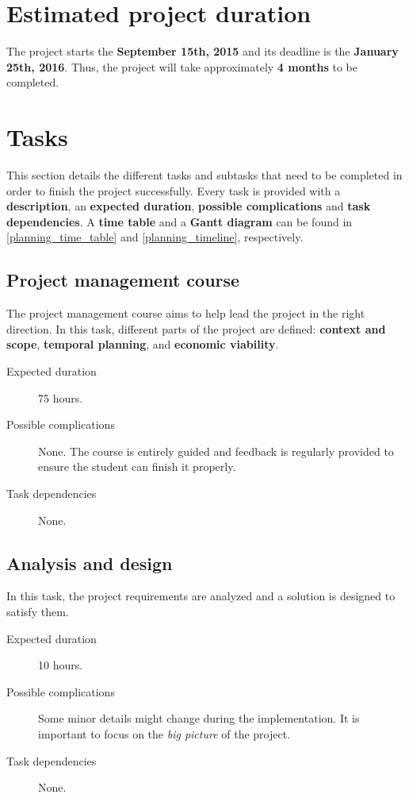 \documentclass[a4paper,11pt,titlepage,abstract,numbers=noenddot,automark,mnsy,intlimits,rgb,dvipsnames]{report}
\begin{document}
\section{Estimated project duration}
The project starts the \textbf{September 15th, 2015} and its deadline is the \textbf{January 25th, 2016}. Thus,
the project will take approximately \textbf{4 months} to be completed.
\section{Tasks}
This section details the different tasks and subtasks that need to be completed in order
to finish the project successfully. Every task is provided with a \textbf{description}, an \textbf{expected duration},
\textbf{possible complications} and \textbf{task dependencies}. A \textbf{time table} and a \textbf{Gantt diagram}
can be found in \autoref{planning_time_table} and \autoref{planning_timeline}, respectively.
\subsection{Project management course}
The project management course aims to help lead the project in the right direction. In this task,
different parts of the project are defined: \textbf{context and scope}, \textbf{temporal planning}, and
\textbf{economic viability}.
\begin{description}
\item[Expected duration]
75 hours.
\item[Possible complications]
None. The course is entirely guided and feedback is
  regularly provided to ensure the student can finish it properly.
\item[Task dependencies]
None.
\end{description}
\subsection{Analysis and design}
In this task, the project requirements are analyzed and a solution is designed to satisfy them.
\begin{description}
\item[Expected duration]
10 hours.
\item[Possible complications]
Some minor details might change during the implementation. It is
  important to focus on the \emph{big picture} of the project.
\item[Task dependencies]
None.
\end{description}
\end{document}

